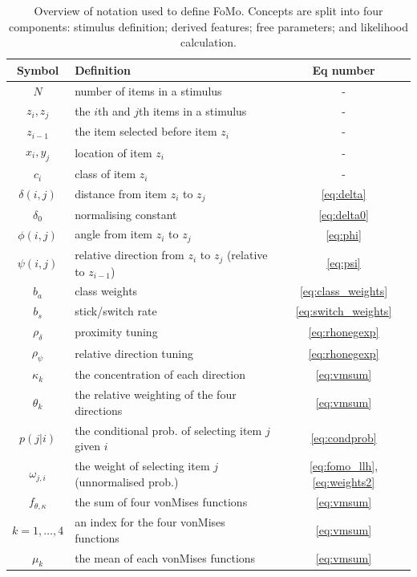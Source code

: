 \documentclass[man, floatsintext]{apa7}
\begin{document}
\begin{table}[bp]
\centering
\begin{tabular}{c|l|c}
\textbf{Symbol} & \textbf{Definition} & \textbf{Eq number} \\
\hline
$N$          & number of items in a stimulus        &      -  \\
$z_i, z_j$   & the $i$th and $j$th items in a stimulus   & -  \\
$z_{i-1}$    & the item selected before item $z_i$     &      -  \\
$x_i, y_j$   & location of item $z_i$               &      -  \\
$c_i$        & class of item $z_i$                  &      -  \\
\hline
$\delta(i, j)$ & distance from item $z_i$ to $z_j$  & \ref{eq:delta}  \\
$\delta_0$ & normalising constant                 &  \ref{eq:delta0} \\
$\phi(i, j)$ & angle from item $z_i$ to $z_j$        & \ref{eq:phi}   \\
$\psi(i, j)$ & relative direction from $z_i$ to $z_j$ (relative to $z_{i-1}$) &  \ref{eq:psi} \\ 
\hline
$b_a$        & class weights         &  \ref{eq:class_weights}         \\
$b_s$    & stick/switch rate     & \ref{eq:switch_weights}        \\
$\rho_{\delta}$ & proximity tuning  & \ref{eq:rhonegexp}             \\
$\rho_{\psi}$   &  relative direction tuning  &  \ref{eq:rhonegexp}    \\
$\kappa_k$   & the concentration of each direction & \ref{eq:vmsum}   \\
$\theta_k$   &  the relative weighting of the four directions  &  \ref{eq:vmsum} \\    
\hline
$p(j|i)$ &  the conditional prob. of selecting item $j$ given $i$ & \ref{eq:condprob} \\
$\omega_{j,i}$ &  the weight of selecting item $j$ (unnormalised prob.) & \ref{eq:fomo_llh}, \ref{eq:weights2} \\
$f_{\theta, \kappa}$ & the sum of four vonMises functions       & \ref{eq:vmsum} \\
$k=1,\ldots,4$      & an index for the four vonMises functions &  \ref{eq:vmsum} \\
$\mu_k$              &  the mean of each vonMises functions      & \ref{eq:vmsum} \\
       
\end{tabular}
\caption{Overview of notation used to define FoMo. Concepts are split into four components: stimulus definition; derived features; free parameters; and likelihood calculation.}
\label{tab:notation}

\end{table}
\end{document}
